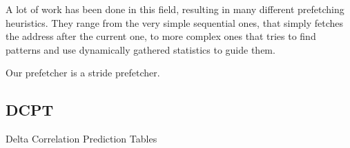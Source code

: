 A lot of work has been done in this field, resulting in many different
prefetching heuristics. They range from the very simple sequential ones, that
simply fetches the address after the current one, to more complex ones that
tries to find patterns and use dynamically gathered statistics to guide them.

Our prefetcher is a stride prefetcher.

\subsection{}


\subsection{DCPT}
Delta Correlation Prediction Tables

